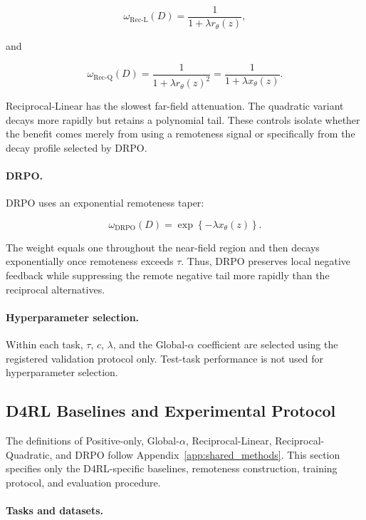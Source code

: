 \documentclass{article}
\theoremstyle{plain}
\theoremstyle{definition}
\theoremstyle{remark}
\begin{document}
\[
\omega_{\mathrm{Rec\text{-}L}}(D)
=
\frac{1}{1+\lambda r_\theta(z)},
\]

and

\[
\omega_{\mathrm{Rec\text{-}Q}}(D)
=
\frac{1}{1+\lambda r_\theta(z)^2}
=
\frac{1}{1+\lambda x_\theta(z)}.
\]

Reciprocal-Linear has the slowest far-field attenuation. The quadratic
variant decays more rapidly but retains a polynomial tail. These
controls isolate whether the benefit comes merely from using a
remoteness signal or specifically from the decay profile selected by
DRPO.

\paragraph{DRPO.}

DRPO uses an exponential remoteness taper:

\[
\omega_{\mathrm{DRPO}}(D)
=
\exp\left\{
-\lambda x_\theta(z)
\right\}.
\]

The weight equals one throughout the near-field region and then decays
exponentially once remoteness exceeds \(\tau\). Thus, DRPO preserves
local negative feedback while suppressing the remote negative tail more
rapidly than the reciprocal alternatives.

\paragraph{Hyperparameter selection.}

Within each task, \(\tau\), \(c\), \(\lambda\), and the
Global-\(\alpha\) coefficient are selected using the registered
validation protocol only. Test-task performance is not used for
hyperparameter selection.


\subsection{D4RL Baselines and Experimental Protocol}
\label{app:d4rl_methods}

The definitions of Positive-only, Global-\(\alpha\),
Reciprocal-Linear, Reciprocal-Quadratic, and DRPO follow
Appendix~\ref{app:shared_methods}. This section specifies only the
D4RL-specific baselines, remoteness construction, training protocol,
and evaluation procedure.

\paragraph{Tasks and datasets.}
\end{document}
